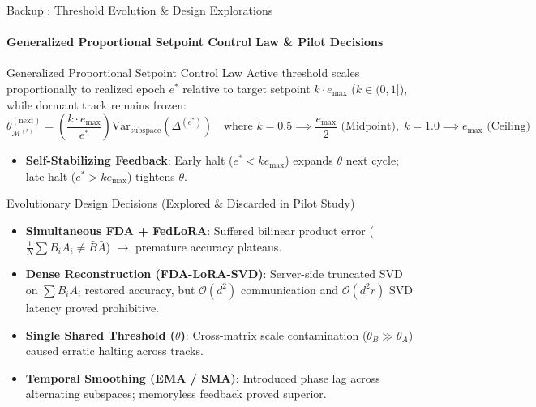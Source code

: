 \documentclass[aspectratio=169]{beamer}
\begin{document}
\begin{frame}[noframenumbering, label=backup_threshold_evolution]{Backup : Threshold Evolution \& Design Explorations}
    \framesubtitle{Generalized Proportional Setpoint Control Law \& Pilot Decisions \hfill \hyperlink{thank_you}{}}
    \vspace{-0.65em}
    \begin{block}{Generalized Proportional Setpoint Control Law}
        \scriptsize
        Active threshold scales proportionally to realized epoch $e^*$ relative to target setpoint $k \cdot e_{\max}$ ($k \in (0, 1]$), while dormant track remains frozen:
        $$\theta_{\mathcal{M}^{(r)}}^{(\text{next})} = \left( \frac{k \cdot e_{\max}}{e^*} \right) \text{Var}_{\text{subspace}}(\Delta^{(e^*)}) \quad \text{where } k=0.5 \implies \frac{e_{\max}}{2} \text{ (Midpoint)}, \; k=1.0 \implies e_{\max} \text{ (Ceiling)}$$
        \begin{itemize}
            \item \textbf{Self-Stabilizing Feedback}: Early halt ($e^* < k e_{\max}$) expands $\theta$ next cycle; late halt ($e^* > k e_{\max}$) tightens $\theta$.
        \end{itemize}
    \end{block}
    \vspace{-0.5em}
    \begin{block}{Evolutionary Design Decisions (Explored \& Discarded in Pilot Study)}
        \scriptsize
        \begin{itemize}
            \item \textbf{Simultaneous FDA + FedLoRA}: Suffered bilinear product error ($\frac{1}{N}\sum B_i A_i \neq \bar{B}\bar{A}$) $\to$ premature accuracy plateaus.
            \item \textbf{Dense Reconstruction (FDA-LoRA-SVD)}: Server-side truncated SVD on $\sum B_i A_i$ restored accuracy, but $\mathcal{O}(d^2)$ communication and $\mathcal{O}(d^2 r)$ SVD latency proved prohibitive.
            \item \textbf{Single Shared Threshold ($\theta$)}: Cross-matrix scale contamination ($\theta_B \gg \theta_A$) caused erratic halting across tracks.
            \item \textbf{Temporal Smoothing (EMA / SMA)}: Introduced phase lag across alternating subspaces; memoryless feedback proved superior.
        \end{itemize}
    \end{block}
\end{frame}
\end{document}
